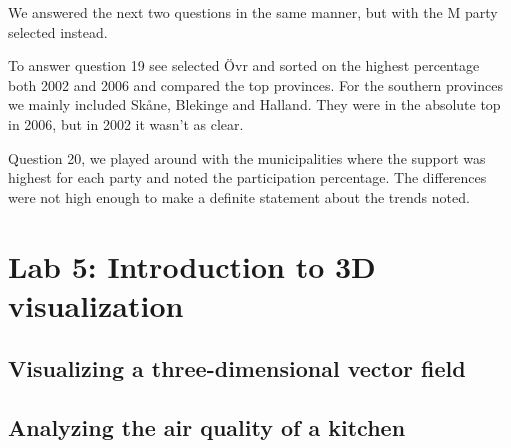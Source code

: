 \documentclass[a4paper]{article}
\begin{document}
We answered the next two questions in the same manner, but with the M party
selected instead.

To answer question 19 see selected \"Ovr and sorted on the highest percentage
both 2002 and 2006 and compared the top provinces. For the southern provinces we
mainly included Sk\aa ne, Blekinge and Halland. They were in the absolute top in
2006, but in 2002 it wasn't as clear.

Question 20, we played around with the municipalities where the support was
highest for each party and noted the participation percentage. The differences
were not high enough to make a definite statement about the trends noted.

\section{Lab 5: Introduction to 3D visualization}

\subsection{Visualizing a three-dimensional vector field}

\subsection{Analyzing the air quality of a kitchen}
\end{document}

